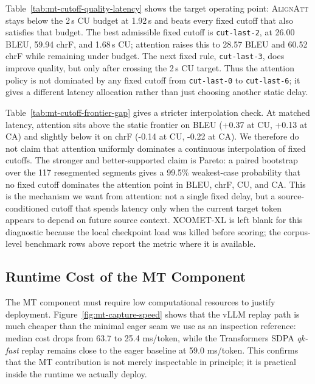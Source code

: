 \documentclass[11pt]{article}
\begin{document}


Table~\ref{tab:mt-cutoff-quality-latency} shows the target operating point:
\textsc{AlignAtt} stays below the 2\,s CU budget at 1.92\,s and beats every
fixed cutoff that also satisfies that budget. The best admissible fixed cutoff
is \texttt{cut-last-2}, at 26.00 BLEU, 59.94 chrF, and 1.68\,s CU; attention
raises this to 28.57 BLEU and 60.52 chrF while remaining under budget. The next
fixed rule, \texttt{cut-last-3}, does improve quality, but only after crossing
the 2\,s CU target. Thus the attention policy is not dominated by any fixed
cutoff from \texttt{cut-last-0} to \texttt{cut-last-6}; it gives a different
latency allocation rather than just choosing another static delay.

Table~\ref{tab:mt-cutoff-frontier-gap} gives a stricter interpolation check.
At matched latency, attention sits above the static frontier on BLEU
(+0.37 at CU, +0.13 at CA) and slightly below it on chrF (-0.14 at CU, -0.22
at CA). We therefore do not claim that attention uniformly dominates a
continuous interpolation of fixed cutoffs. The stronger and better-supported
claim is Pareto: a paired bootstrap over the 117 resegmented segments gives a
99.5\% weakest-case probability that no fixed cutoff dominates the attention
point in BLEU, chrF, CU, and CA. This is the mechanism we want from attention:
not a single fixed delay, but a source-conditioned cutoff that spends latency
only when the current target token appears to depend on future source context.
XCOMET-XL is left blank for this diagnostic because the local checkpoint load
was killed before scoring; the corpus-level benchmark rows above report the
metric where it is available.

\subsection{Runtime Cost of the MT Component}
\label{sec:runtime}

The MT component must require low computational resources to justify deployment.
Figure~\ref{fig:mt-capture-speed} shows that the vLLM replay path is
much cheaper than the minimal eager seam we use as an inspection reference:
median cost drops from 63.7 to 25.4 ms/token, while the Transformers
SDPA \emph{qk-fast} replay remains close to the eager baseline at
59.0 ms/token.
This confirms that the MT contribution is not merely inspectable in principle;
it is practical inside the runtime we actually deploy.
\end{document}
